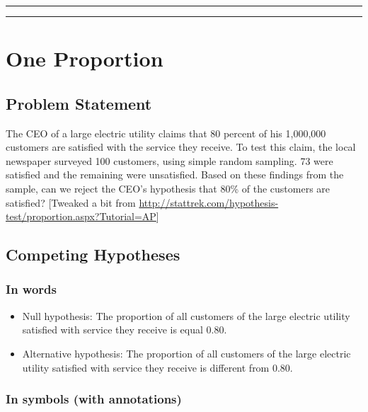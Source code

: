 \documentclass[]{tufte-book}
\let\oldrule=\rule
\renewcommand{\rule}[1]{\oldrule{\linewidth}}
\begin{document}
\begin{center}\rule{0.5\linewidth}{\linethickness}\end{center}

\begin{center}\rule{0.5\linewidth}{\linethickness}\end{center}

\section{One Proportion}\label{one-proportion}

\subsection{Problem Statement}\label{problem-statement-1}

The CEO of a large electric utility claims that 80 percent of his
1,000,000 customers are satisfied with the service they receive. To test
this claim, the local newspaper surveyed 100 customers, using simple
random sampling. 73 were satisfied and the remaining were unsatisfied.
Based on these findings from the sample, can we reject the CEO's
hypothesis that 80\% of the customers are satisfied? {[}Tweaked a bit
from
\url{http://stattrek.com/hypothesis-test/proportion.aspx?Tutorial=AP}{]}

\subsection{Competing Hypotheses}\label{competing-hypotheses-1}

\subsubsection{In words}\label{in-words-1}

\begin{itemize}
\item
  Null hypothesis: The proportion of all customers of the large electric
  utility satisfied with service they receive is equal 0.80.
\item
  Alternative hypothesis: The proportion of all customers of the large
  electric utility satisfied with service they receive is different from
  0.80.
\end{itemize}

\subsubsection{In symbols (with
annotations)}\label{in-symbols-with-annotations-1}
\end{document}
